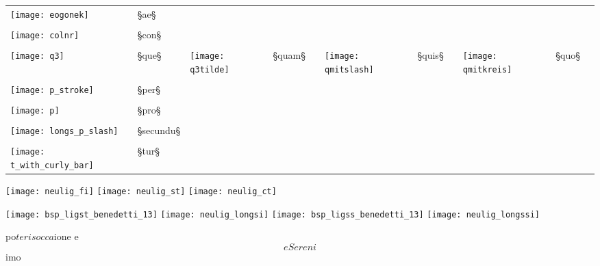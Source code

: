 \begin{liste}
\begin{longtable}[l]{lllllllllll}
\texttt{[image: eogonek]} & §{ae}§ \\ \\
\texttt{[image: colnr]} & §{con}§
\\ \\
\texttt{[image: q3]} & §{que}§
&
\texttt{[image: q3tilde]} & §{quam}§
&&
\texttt{[image: qmitslash]} & §{quis}§
&&
\texttt{[image: qmitkreis]} & §{quo}§
\\ \\
\texttt{[image: p\_stroke]} & §{per}§
\\ \\
\texttt{[image: p]} & §{pro}§
\\ \\
\texttt{[image: longs\_p\_slash]} & §{secundu}§
\\ \\
\texttt{[image: t\_with\_curly\_bar]} & §{tur}§
\end{longtable}
\end{liste}

\begin{example}

\texttt{[image: neulig\_fi]} \quad
\texttt{[image: neulig\_st]} \quad
\texttt{[image: neulig\_ct]}

\vspace{-3mm}

\texttt{[image: bsp\_ligst\_benedetti\_13]} \quad
\texttt{[image: neulig\_longsi]} \quad
\texttt{[image: bsp\_ligss\_benedetti\_13]} \quad
\texttt{[image: neulig\_longssi]}

\vspace{-3mm}
\begin{typeLatin}
po$teris        occa$ione          e$$e     Sereni$$imo
\end{typeLatin}

\end{example}

